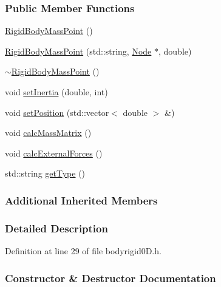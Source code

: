 \subsubsection*{Public Member Functions}
\begin{DoxyCompactItemize}
\item 
\hyperlink{classmknix_1_1_rigid_body_mass_point_abfaacfed0f515ff66207028b558b8fd2}{Rigid\+Body\+Mass\+Point} ()
\item 
\hyperlink{classmknix_1_1_rigid_body_mass_point_a4cd5dda763fcc9f796952f209bd7b2dc}{Rigid\+Body\+Mass\+Point} (std\+::string, \hyperlink{classmknix_1_1_node}{Node} $\ast$, double)
\item 
\hyperlink{classmknix_1_1_rigid_body_mass_point_a005fcbbf85deb13c32e87c9a3ef51844}{$\sim$\+Rigid\+Body\+Mass\+Point} ()
\item 
void \hyperlink{classmknix_1_1_rigid_body_mass_point_a1d06b28d8a37323aba31649518ff4b85}{set\+Inertia} (double, int)
\item 
void \hyperlink{classmknix_1_1_rigid_body_mass_point_a74fcf74f09c6c5abaa0cd0fe7383e2a5}{set\+Position} (std\+::vector$<$ double $>$ \&)
\item 
void \hyperlink{classmknix_1_1_rigid_body_mass_point_aed37447f963c4393b30febe281589b99}{calc\+Mass\+Matrix} ()
\item 
void \hyperlink{classmknix_1_1_rigid_body_mass_point_a281842fc7cf1367bbed4c5e477ac8da9}{calc\+External\+Forces} ()
\item 
std\+::string \hyperlink{classmknix_1_1_rigid_body_mass_point_aa97f367f1f1701f5d7981c994a96fb5e}{get\+Type} ()
\end{DoxyCompactItemize}
\subsubsection*{Additional Inherited Members}


\subsubsection{Detailed Description}


Definition at line 29 of file bodyrigid0\+D.\+h.



\subsubsection{Constructor \& Destructor Documentation}
\hypertarget{classmknix_1_1_rigid_body_mass_point_abfaacfed0f515ff66207028b558b8fd2}{}
